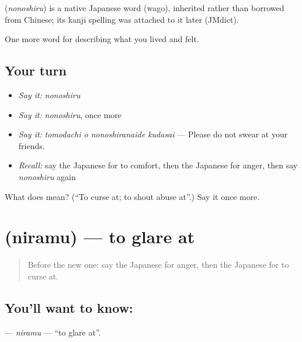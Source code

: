 \begin{cousinweb}
\textbf{} (\emph{nonoshiru}) is a native Japanese word (wago), inherited rather than borrowed from Chinese; its kanji spelling was attached to it later (JMdict).
\end{cousinweb}

\begin{grammarlens}[title={What you've built}]
One more word for describing what you lived and felt.
\end{grammarlens}

\subsection*{Your turn}
\begin{itemize}
\raggedright
  \item \emph{Say it:} \emph{nonoshiru}
  \item \emph{Say it:} \emph{nonoshiru}, once more
  \item \emph{Say it:} \emph{tomodachi o nonoshiranaide kudasai} — Please do not swear at your friends.
  \item \emph{Recall:} say the Japanese for to comfort, then the Japanese for anger, then say \emph{nonoshiru} again
\end{itemize}

\begin{tcolorbox}[breakable,colback=teal!4,colframe=teal!35!black,title={Before you move on}]
What does  mean? (\textquotedblleft{}To curse at; to shout abuse at\textquotedblright{}.) Say it once more.
\end{tcolorbox}
\section[\texorpdfstring{\ja{にらむ} (niramu)}{にらむ (niramu)}]{ (niramu) — to glare at}

\label{lesson:JA-C430-niramu}



\begin{quote}
Before the new one: say the Japanese for anger, then the Japanese for to curse at.
\end{quote}

\subsection*{You'll want to know: }
\textbf{} — \emph{niramu} — \textquotedblleft{}to glare at\textquotedblright{}.


